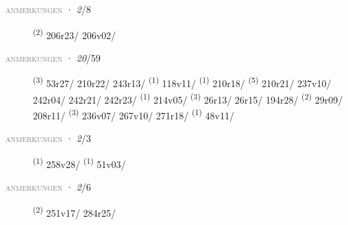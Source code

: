 \textsc{\textcolor{gray}{anmerkungen}}
\ENTRYEND
\noindent{} · \textit{2}/8 \LEMMALINE
\begin{description}
    \item[]  \textsuperscript{(2)} \mbox{206r23/} \mbox{206v02/}
\end{description}
\textsc{\textcolor{gray}{anmerkungen}}
\ENTRYEND
\noindent{} · \textit{20}/59 \LEMMALINE
\begin{description}
    \item[]  \textsuperscript{(3)} \mbox{53r27/} \mbox{210r22/} \mbox{243r13/} \textsuperscript{(1)} \mbox{118v11/} \textsuperscript{(1)} \mbox{210r18/} \textsuperscript{(5)} \mbox{210r21/} \mbox{237v10/} \mbox{242r04/} \mbox{242r21/} \mbox{242r23/} \textsuperscript{(1)} \mbox{214v05/} \CASEBREAK {} \textsuperscript{(3)} \mbox{26r13/} \mbox{26r15/} \mbox{194r28/} \textsuperscript{(2)} \mbox{29r09/} \mbox{208r11/} \textsuperscript{(3)} \mbox{236v07/} \mbox{267v10/} \mbox{271r18/} \CASEBREAK {} \textsuperscript{(1)} \mbox{48v11/}
\end{description}
\textsc{\textcolor{gray}{anmerkungen}}
\ENTRYEND
\noindent{} · \textit{2}/3 \LEMMALINE
\begin{description}
    \item[]  \textsuperscript{(1)} \mbox{258v28/} \CASEBREAK {} \textsuperscript{(1)} \mbox{51v03/}
\end{description}
\textsc{\textcolor{gray}{anmerkungen}}
\ENTRYEND
\noindent{} · \textit{2}/6 \LEMMALINE
\begin{description}
    \item[]  \textsuperscript{(2)} \mbox{251v17/} \mbox{284r25/}
\end{description}
